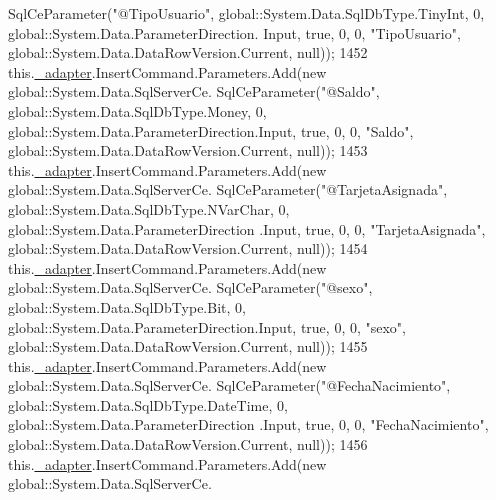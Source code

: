 \begin{DoxyCode}
      SqlCeParameter(\textcolor{stringliteral}{"@TipoUsuario"}, global::System.Data.SqlDbType.TinyInt, 0, global::System.Data.ParameterDirection.
      Input, \textcolor{keyword}{true}, 0, 0, \textcolor{stringliteral}{"TipoUsuario"}, global::System.Data.DataRowVersion.Current, null));
1452             this.\hyperlink{class_proyecto___integrador__3_1_1ds_usuarios_table_adapters_1_1_usuarios_table_adapter_ab48b9b83ce2db01dbbc83ad45b428a80}{\_adapter}.InsertCommand.Parameters.Add(\textcolor{keyword}{new} global::System.Data.SqlServerCe.
      SqlCeParameter(\textcolor{stringliteral}{"@Saldo"}, global::System.Data.SqlDbType.Money, 0, global::System.Data.ParameterDirection.Input, \textcolor{keyword}{true},
       0, 0, \textcolor{stringliteral}{"Saldo"}, global::System.Data.DataRowVersion.Current, null));
1453             this.\hyperlink{class_proyecto___integrador__3_1_1ds_usuarios_table_adapters_1_1_usuarios_table_adapter_ab48b9b83ce2db01dbbc83ad45b428a80}{\_adapter}.InsertCommand.Parameters.Add(\textcolor{keyword}{new} global::System.Data.SqlServerCe.
      SqlCeParameter(\textcolor{stringliteral}{"@TarjetaAsignada"}, global::System.Data.SqlDbType.NVarChar, 0, global::System.Data.ParameterDirection
      .Input, \textcolor{keyword}{true}, 0, 0, \textcolor{stringliteral}{"TarjetaAsignada"}, global::System.Data.DataRowVersion.Current, null));
1454             this.\hyperlink{class_proyecto___integrador__3_1_1ds_usuarios_table_adapters_1_1_usuarios_table_adapter_ab48b9b83ce2db01dbbc83ad45b428a80}{\_adapter}.InsertCommand.Parameters.Add(\textcolor{keyword}{new} global::System.Data.SqlServerCe.
      SqlCeParameter(\textcolor{stringliteral}{"@sexo"}, global::System.Data.SqlDbType.Bit, 0, global::System.Data.ParameterDirection.Input, \textcolor{keyword}{true}, 0,
       0, \textcolor{stringliteral}{"sexo"}, global::System.Data.DataRowVersion.Current, null));
1455             this.\hyperlink{class_proyecto___integrador__3_1_1ds_usuarios_table_adapters_1_1_usuarios_table_adapter_ab48b9b83ce2db01dbbc83ad45b428a80}{\_adapter}.InsertCommand.Parameters.Add(\textcolor{keyword}{new} global::System.Data.SqlServerCe.
      SqlCeParameter(\textcolor{stringliteral}{"@FechaNacimiento"}, global::System.Data.SqlDbType.DateTime, 0, global::System.Data.ParameterDirection
      .Input, \textcolor{keyword}{true}, 0, 0, \textcolor{stringliteral}{"FechaNacimiento"}, global::System.Data.DataRowVersion.Current, null));
1456             this.\hyperlink{class_proyecto___integrador__3_1_1ds_usuarios_table_adapters_1_1_usuarios_table_adapter_ab48b9b83ce2db01dbbc83ad45b428a80}{\_adapter}.InsertCommand.Parameters.Add(\textcolor{keyword}{new} global::System.Data.SqlServerCe.

\end{DoxyCode}
